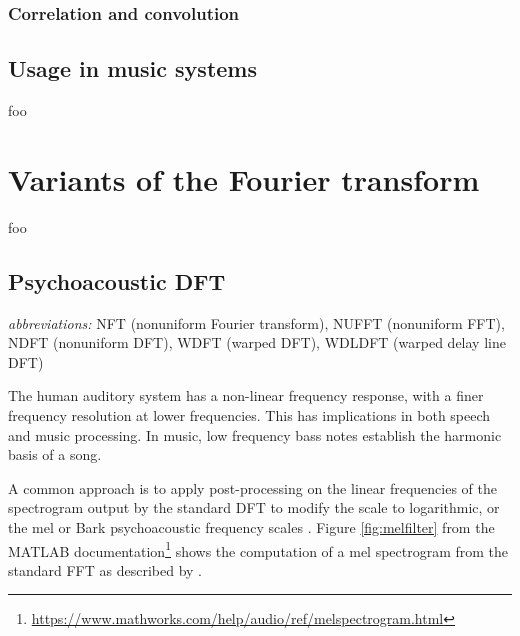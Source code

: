 \documentclass[letter,12pt,notitlepage]{article}
\begin{document}
\subsubsection{Correlation and convolution}

\subsection{Usage in music systems}

foo

\vfill
\clearpage

\section{Variants of the Fourier transform}
\label{sec:theoryvariant}

foo

\subsection{Psychoacoustic DFT}

\qquad \textit{abbreviations:} NFT (nonuniform Fourier transform), NUFFT (nonuniform FFT), NDFT (nonuniform DFT), WDFT (warped DFT), WDLDFT (warped delay line DFT)

The human auditory system has a non-linear frequency response, with a finer frequency resolution at lower frequencies.  This has implications in both speech and music processing. In music, low frequency bass notes establish the harmonic basis of a song. 


A common approach is to apply post-processing on the linear frequencies of the spectrogram output by the standard DFT to modify the scale to logarithmic, or the mel or Bark psychoacoustic frequency scales . Figure \ref{fig:melfilter} from the MATLAB documentation\footnote{\href{https://www.mathworks.com/help/audio/ref/melspectrogram.html}{https://www.mathworks.com/help/audio/ref/melspectrogram.html}} shows the computation of a mel spectrogram from the standard FFT as described by \citet[463]{melbook}.

\end{document}

